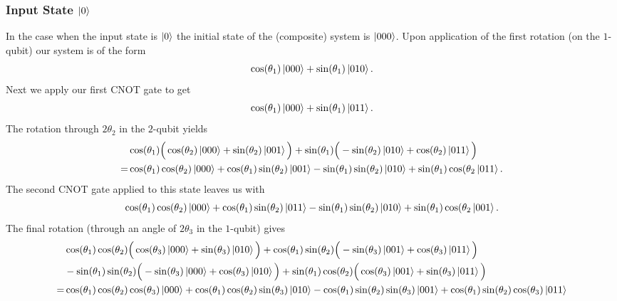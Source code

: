 \documentclass[reqno]{amsart}
\numberwithin{lemma}{section}
\numberwithin{proposition}{section}
\begin{document}
{\subsubsection{Input State $\ket{0}$}
In the case when the input state is $\ket{0}$ the initial state of the (composite) system is $\ket{000}$. Upon application of the first rotation (on the $1$-qubit) our system is of the form
\begin{equation*}
\cos(\theta_{1}) \ket{000} + \sin(\theta_{1}) \ket{010}.
\end{equation*}
Next we apply our first CNOT gate to get
\begin{equation*}
\cos(\theta_{1}) \ket{000} + \sin(\theta_{1}) \ket{011}.
\end{equation*}
The rotation through $2\theta_{2}$ in the $2$-qubit yields
\begin{align*}
&\cos(\theta_{1}) \Big ( \cos(\theta_{2}) \ket{000} + \sin(\theta_{2}) \ket{001} \Big ) + \sin(\theta_{1}) \Big ( -\sin(\theta_{2}) \ket{010} + \cos(\theta_{2}) \ket{011} \Big )\\
= & \cos(\theta_{1}) \cos(\theta_{2}) \ket{000} + \cos(\theta_{1}) \sin(\theta_{2}) \ket{001} - \sin(\theta_{1}) \sin(\theta_{2}) \ket{010} + \sin(\theta_{1}) \cos(\theta_{2} \ket{011}.
\end{align*}
The second CNOT gate applied to this state leaves us with
\begin{equation*}
\cos(\theta_{1}) \cos(\theta_{2}) \ket{000} + \cos(\theta_{1}) \sin(\theta_{2}) \ket{011} - \sin(\theta_{1}) \sin(\theta_{2}) \ket{010} + \sin(\theta_{1}) \cos(\theta_{2} \ket{001}.
\end{equation*}
The final rotation (through an angle of $2\theta_{3}$ in the $1$-qubit) gives
\begin{align*}
&\cos(\theta_{1}) \cos(\theta_{2}) \Big ( \cos(\theta_{3}) \ket{000} + \sin(\theta_{3}) \ket{010} \Big ) + \cos(\theta_{1}) \sin(\theta_{2}) \Big ( -\sin(\theta_{3}) \ket{001} + \cos(\theta_{3}) \ket{011} \Big )\\
& - \sin(\theta_{1}) \sin(\theta_{2}) \Big ( -\sin(\theta_{3}) \ket{000} + \cos(\theta_{3}) \ket{010} \Big ) + \sin(\theta_{1}) \cos(\theta_{2}) \Big ( \cos(\theta_{3}) \ket{001} + \sin(\theta_{3}) \ket{011} \Big )\\
= & \cos(\theta_{1}) \cos(\theta_{2}) \cos(\theta_{3}) \ket{000} + \cos(\theta_{1}) \cos(\theta_{2}) \sin(\theta_{3}) \ket{010}
- \cos(\theta_{1}) \sin(\theta_{2}) \sin(\theta_{3}) \ket{001} + \cos(\theta_{1}) \sin(\theta_{2}) \cos(\theta_{3}) \ket{011}\\

\end{align*}}
\end{document}
